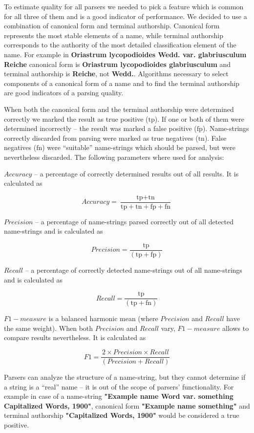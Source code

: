 \documentclass{bmcart}
\begin{document}
To estimate quality for all parsers we needed to pick a feature which is common
for all three of them and is a good indicator of performance.  We decided to
use a combination of canonical form and terminal authorship.  Canonical form
represents the most stable elements of a name, while terminal authorship
corresponds to the authority of the most detailed classification element of the
name. For example in \textbf{Oriastrum lycopodioides Wedd.  var.  glabriusculum
Reiche} canonical form is \textbf{Oriastrum lycopodioides glabriusculum} and
terminal authorship is \textbf{Reiche}, not \textbf{Wedd.}.  Algorithms
necessary to select components of a canonical form of a name and to find the
terminal authorship are good indicators of a parsing quality.

When both the canonical form and the terminal authorship were determined
correctly we marked the result as true positive ($\text{tp}$).  If one or both
of them were determined incorrectly -- the result was marked a false positive
($\text{fp}$). Name-strings correctly discarded from parsing were marked as
true negatives ($\text{tn}$). False negatives ($\text{fn}$) were ``suitable''
name-strings which should be parsed, but were nevertheless discarded. The
following parameters where used for analysis:

$Accuracy$ -- a percentage of correctly determined results out of all results.
It is calculated as

\[Accuracy = \dfrac{\text{tp} + \text{tn}}
  {\text{tp} + \text{tn} + \text{fp} + \text{fn}}\]

$Precision$ -- a percentage of name-strings parsed correctly out of all
detected name-strings and is calculated as

\[Precision = \dfrac{\text{tp}}{(\text{tp} + \text{fp})}\]

$Recall$ -- a percentage of correctly detected name-strings out of all name-strings and is calculated as

\[Recall = \dfrac{\text{tp}}{(\text{tp} + \text{fn})}\]

$F1-measure$ is a balanced harmonic mean (where $Precision$ and $Recall$ have
the same weight). When both $Precision$ and $Recall$ vary, $F1-measure$ allows
to compare results nevertheless. It is calculated as

\[F1 = \dfrac{2 \times Precision \times Recall}{(Precision + Recall)}\]

Parsers can analyze the structure of a name-string, but they cannot determine
if a string is a ``real'' name -- it is out of the scope of parsers'
functionality.  For example in case of a name-string \textbf{"Example name Word
var. something Capitalized Words, 1900"}, canonical form \textbf{"Example
name something"} and terminal authorship \textbf{"Capitalized Words, 1900"}
would be considered a true positive.
\end{document}
